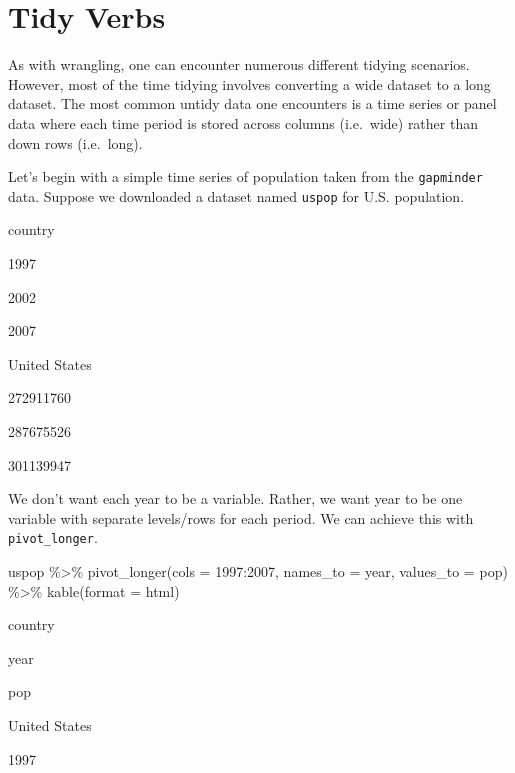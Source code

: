 \documentclass[
]{book}
\makeatletter
\newenvironment{Shaded}{\begin{snugshade}}{\end{snugshade}}
\newcommand{\AttributeTok}[1]{\textcolor[rgb]{0.61,0.61,0.61}{#1}}
\newcommand{\FunctionTok}[1]{\textcolor[rgb]{0,0,0}{#1}}
\newcommand{\NormalTok}[1]{#1}
\newcommand{\SpecialCharTok}[1]{\textcolor[rgb]{0,0,0}{#1}}
\newcommand{\StringTok}[1]{\textcolor[rgb]{0.5,0.5,0.5}{#1}}
\newenvironment{kframe}{%
\medskip{}
\setlength{\fboxsep}{.8em}
 \def\at@end@of@kframe{}%
 \ifinner\ifhmode%
  \def\at@end@of@kframe{\end{minipage}}%
  \begin{minipage}{\columnwidth}%
 \fi\fi%
 \def\FrameCommand##1{\hskip\@totalleftmargin \hskip-\fboxsep
 \colorbox{shadecolor}{##1}\hskip-\fboxsep
     \hskip-\linewidth \hskip-\@totalleftmargin \hskip\columnwidth}%
 \MakeFramed {\advance\hsize-\width
   \@totalleftmargin\z@ \linewidth\hsize
   \@setminipage}}%
 {\par\unskip\endMakeFramed%
 \at@end@of@kframe}
\renewenvironment{Shaded}{\begin{kframe}}{\end{kframe}}
\makeatother
\begin{document}
\hypertarget{tidy-verbs}{%
\section{Tidy Verbs}\label{tidy-verbs}}

As with wrangling, one can encounter numerous different tidying scenarios. However, most of the time tidying involves converting a wide dataset to a long dataset. The most common untidy data one encounters is a time series or panel data where each time period is stored across columns (i.e.~wide) rather than down rows (i.e.~long).

Let's begin with a simple time series of population taken from the \texttt{gapminder} data. Suppose we downloaded a dataset named \texttt{uspop} for U.S. population.

country

1997

2002

2007

United States

272911760

287675526

301139947

We don't want each year to be a variable. Rather, we want year to be one variable with separate levels/rows for each period. We can achieve this with \texttt{pivot\_longer}.

\begin{Shaded}
\begin{Highlighting}[]
\NormalTok{uspop }\SpecialCharTok{\%\textgreater{}\%} 
  \FunctionTok{pivot\_longer}\NormalTok{(}\AttributeTok{cols =} \StringTok{\textquotesingle{}1997\textquotesingle{}}\SpecialCharTok{:}\StringTok{\textquotesingle{}2007\textquotesingle{}}\NormalTok{, }
               \AttributeTok{names\_to =} \StringTok{\textquotesingle{}year\textquotesingle{}}\NormalTok{,}
               \AttributeTok{values\_to =} \StringTok{\textquotesingle{}pop\textquotesingle{}}\NormalTok{) }\SpecialCharTok{\%\textgreater{}\%} 
  \FunctionTok{kable}\NormalTok{(}\AttributeTok{format =} \StringTok{\textquotesingle{}html\textquotesingle{}}\NormalTok{)}
\end{Highlighting}
\end{Shaded}

country

year

pop

United States

1997
\end{document}
